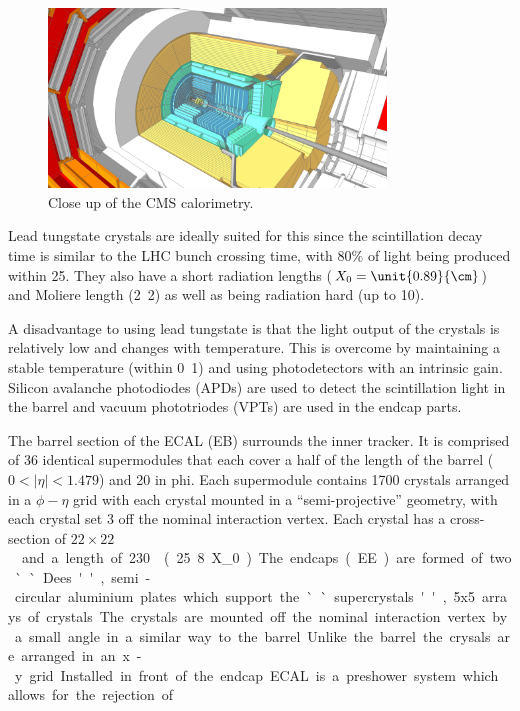 \begin{figure}[htb!]
  \centering
  \includegraphics[width=0.8\textwidth]{hcal.png}
  \caption{Close up of the CMS calorimetry.}
  \label{fig:calo}
\end{figure}

Lead tungstate crystals are ideally suited for this since the scintillation
decay time is similar to the LHC bunch crossing time, 
with \unit{80}{\%} of light being produced within \unit{25}{\ns}.
They also have a short radiation lengths ($X_0=\unit{0.89}{\cm}$) 
and Moliere length (\unit{2.2}{\cm}) as well as being radiation hard
(up to \unit{10}{\mrad}).

A disadvantage to using lead tungstate is that the light output of the crystals
is relatively low and changes with temperature. This is overcome by maintaining
a stable temperature (within \unit{0.1}{\degreecelsius}) and using
photodetectors with an intrinsic gain.
Silicon avalanche photodiodes (APDs) are used to detect the scintillation light
in the barrel and vacuum phototriodes (VPTs) are used in the endcap parts.

The barrel section of the ECAL (EB) surrounds the inner tracker. It is comprised
of 36 identical supermodules that each cover a half of the length of the barrel
($0<|\eta|<1.479$) and \unit{20}{\degree} in phi. Each supermodule contains
1700 crystals arranged in a $\phi - \eta$ grid with each crystal mounted in a
``semi-projective'' geometry, with each crystal set \unit{3}{\degree} off the
nominal interaction vertex. Each crystal has a cross-section of
\unit{$22 \times 22$}{\mm\squared} and a length of
\unit{230}{\mm} (\unit{25.8}{X_0}).

The endcaps (EE) are formed of two ``Dees'', semi-circular aluminium plates
which support the ``supercrystals'', 5x5 arrays of crystals. The crystals are
mounted off the nominal interaction vertex by a small angle in a similar way
to the barrel. 
Unlike the barrel the crysals are arranged in an x-y grid.
Installed in front of the endcap ECAL is a preshower system which allows for
the rejection of \Ppizero .\cite{cms}

